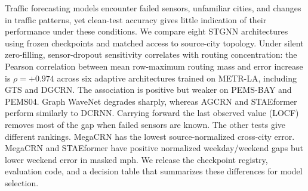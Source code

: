 Traffic forecasting models encounter failed sensors, unfamiliar cities, and
changes in traffic patterns, yet clean-test accuracy gives little indication
of their performance under these conditions. We compare eight STGNN
architectures using frozen checkpoints and matched access to source-city
topology. Under silent zero-filling, sensor-dropout sensitivity correlates
with routing concentration: the Pearson correlation between mean row-maximum
routing mass and error increase is $\rho{=}{+}0.974$ across six adaptive
architectures trained on METR-LA, including GTS and DGCRN. The association
is positive but weaker on PEMS-BAY and PEMS04. Graph WaveNet degrades sharply,
whereas AGCRN and STAEformer perform similarly to DCRNN. Carrying forward
the last observed value (LOCF) removes most of the gap when failed sensors
are known. The other tests give different rankings. MegaCRN has the lowest
source-normalized cross-city error. MegaCRN and STAEformer have positive
normalized weekday/weekend gaps but lower weekend error in masked mph.
We release the checkpoint registry, evaluation code, and a decision table
that summarizes these differences for model selection.
